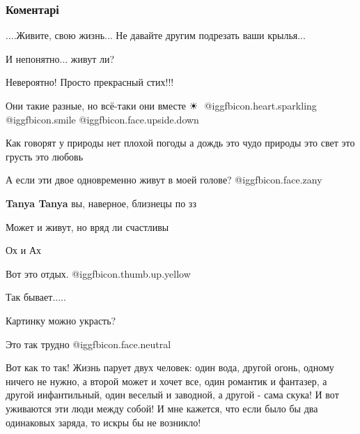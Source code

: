  
 
 
 
 
\subsubsection{Коментарі}
\label{sec:25_11_2021.fb.vselennaja_mudrosti.1.dva_raznyh_cheloveka.cmt}

\begin{itemize} %
....Живите, свою жизнь... Не давайте другим подрезать ваши крылья...

И непонятно... живут ли?

Невероятно! Просто прекрасный стих!!!

Они такие разные, но всё-таки они вместе ☀ ️  @igg{fbicon.heart.sparkling}  @igg{fbicon.smile}  @igg{fbicon.face.upside.down} 


Как говорят у природы нет плохой погоды а дождь это чудо природы это свет это грусть это любовь

А если эти двое одновременно живут в моей голове?  @igg{fbicon.face.zany} 

\textbf{Tanya Tanya} вы, наверное, близнецы по зз

Может и живут, но вряд ли счастливы

Ох и Ах

Вот это отдых.  @igg{fbicon.thumb.up.yellow} 

Так бывает.....

Картинку можно украсть?

Это так трудно @igg{fbicon.face.neutral} 


Вот как то так! Жизнь парует двух человек: один вода, другой огонь, одному
ничего не нужно, а второй может и хочет все, один романтик и фантазер, а другой
инфантильный, один веселый и заводной, а другой - сама скука! И вот уживаются
эти люди между собой! И мне кажется, что если было бы два одинаковых заряда, то
искры бы не возникло!


\end{itemize}
